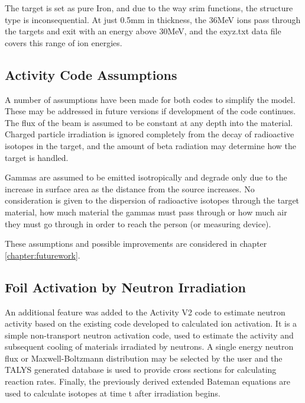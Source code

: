 The target is set as pure Iron, and due to the way \acrshort{srim} functions, the structure type is inconsequential.  At just 0.5mm in thickness, the 36MeV ions pass through the targets and exit with an energy above 30MeV, and the exyz.txt data file covers this range of ion energies.


\subsection{Activity Code Assumptions}

A number of assumptions have been made for both codes to simplify the model.  These may be addressed in future versions if development of the code continues.  The flux of the beam is assumed to be constant at any depth into the material.  Charged particle irradiation is ignored completely from the decay of radioactive isotopes in the target, and the amount of beta radiation may determine how the target is handled.

Gammas are assumed to be emitted isotropically and degrade only due to the increase in surface area as the distance from the source increases.  No consideration is given to the dispersion of radioactive isotopes through the target material, how much material the gammas must pass through or how much air they must go through in order to reach the person (or measuring device).

These assumptions and possible improvements are considered in chapter \ref{chapter:futurework}.


\FloatBarrier



\subsection{Foil Activation by Neutron Irradiation}

An additional feature was added to the Activity V2 code to estimate neutron activity based on the existing code developed to calculated ion activation.  It is a simple non-transport neutron activation code, used to estimate the activity and subsequent cooling of materials irradiated by neutrons.  A single energy neutron flux or Maxwell-Boltzmann distribution may be selected by the user and the TALYS generated database is used to provide cross sections for calculating reaction rates.  Finally, the previously derived extended Bateman equations are used to calculate isotopes at time t after irradiation begins.


\FloatBarrier
